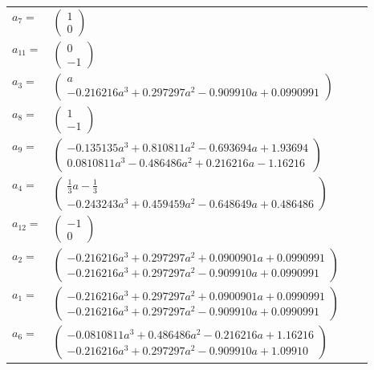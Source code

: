 \documentclass[1p]{elsarticle_modified}
\theoremstyle{definition}
\begin{document}
\begin{tabular}{m{7pt} m{180pt} m{7pt} m{180pt} }
\flushright $a_{7}=$&$\begin{pmatrix}1\\0\end{pmatrix}$ \\
\flushright $a_{11}=$&$\begin{pmatrix}0\\-1\end{pmatrix}$ \\
\flushright $a_{3}=$&$\begin{pmatrix}a\\-0.216216 a^{3}+0.297297 a^{2}-0.909910 a+0.0990991\end{pmatrix}$ \\
\flushright $a_{8}=$&$\begin{pmatrix}1\\-1\end{pmatrix}$ \\
\flushright $a_{9}=$&$\begin{pmatrix}-0.135135 a^{3}+0.810811 a^{2}-0.693694 a+1.93694\\0.0810811 a^{3}-0.486486 a^{2}+0.216216 a-1.16216\end{pmatrix}$ \\
\flushright $a_{4}=$&$\begin{pmatrix}\frac{1}{3} a-\frac{1}{3}\\-0.243243 a^{3}+0.459459 a^{2}-0.648649 a+0.486486\end{pmatrix}$ \\
\flushright $a_{12}=$&$\begin{pmatrix}-1\\0\end{pmatrix}$ \\
\flushright $a_{2}=$&$\begin{pmatrix}-0.216216 a^{3}+0.297297 a^{2}+0.0900901 a+0.0990991\\-0.216216 a^{3}+0.297297 a^{2}-0.909910 a+0.0990991\end{pmatrix}$ \\
\flushright $a_{1}=$&$\begin{pmatrix}-0.216216 a^{3}+0.297297 a^{2}+0.0900901 a+0.0990991\\-0.216216 a^{3}+0.297297 a^{2}-0.909910 a+0.0990991\end{pmatrix}$ \\
\flushright $a_{6}=$&$\begin{pmatrix}-0.0810811 a^{3}+0.486486 a^{2}-0.216216 a+1.16216\\-0.216216 a^{3}+0.297297 a^{2}-0.909910 a+1.09910\end{pmatrix}$ \\

\end{tabular}
\end{document}
